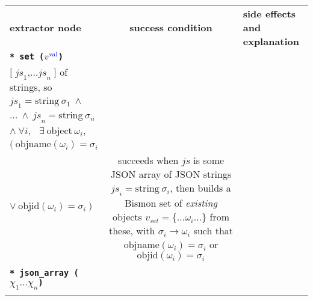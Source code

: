 \begin{table}%
  \begin{relsize}{-1.3}
  \begin{center}
    \begin{tabular}{lcp{6.4cm}}
      \textbf{extractor node} & \hspace*{1cm} \textbf{success condition} \hspace*{1cm}  & \textbf{side effects and explanation} \\

      \texttt{\textbf{* set ($v^{\mathrm{\textcolor{blue}{val}}}$)}} &
      \begin{minipage}[t]{4.5cm}
        $\mathit{js} \equiv \mathrm{some ~ JSON ~ array}$ \\
        \hspace*{2em}  $ \mathtt{\textbf{[}} \; \mathit{js}_1  \mathtt{\textbf{,}} \ldots  \mathit{js}_n \; \mathtt{\textbf{]}} $ of strings, so \\
        \hspace*{1em} $\mathit{js}_1 = \mathrm{string} ~ \sigma_1 ~ \wedge$ \\
        \hspace*{2em} $ \ldots ~ \wedge ~ \mathit{js}_n = \mathrm{string} ~ \sigma_n$ \\
        \hspace*{0.5em} $ \wedge ~ \forall i, ~ \; ~ \exists ~ \mathrm{object} ~ \omega_i,$ \\
        \hspace*{1em} $( ~ \mathrm{objname}(\omega_i) = \sigma_i $ \\
        \hspace*{1.8em} $ \vee ~ \mathrm{objid} (\omega_i) = \sigma_i ~ )$ 
      \end{minipage}
      &
      succeeds when $\mathit{js}$ is some JSON array of JSON strings
      $\mathit{js}_i = \mathrm{string} ~ \sigma_i$,
      then builds a Bismon set of \emph{existing} objects $ v_{set} = \{ \ldots \omega_i \ldots \} $ from these, with
      $\sigma_i \rightarrow \omega_i$ such that $\mathrm{objname}(\omega_i) = \sigma_i$ or  $\mathrm{objid}(\omega_i) = \sigma_i$  \\
            \rule{0pt}{1ex} \\
      \texttt{\textbf{* json\_array ($\chi_1 \ldots \chi_n$)}} &
      \begin{minipage}[t]{4.5cm}
        $\mathit{js} \equiv \mathrm{some ~ JSON ~ array}$ \\

\end{minipage}
\end{tabular}
\end{center}
\end{relsize}
\end{table}
